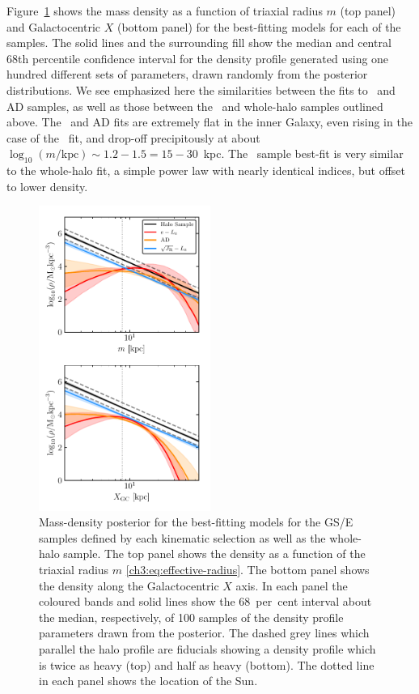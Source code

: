Figure~\ref{ch3:fig:pdensity} shows the mass density as a function of triaxial radius $m$ (top panel) and Galactocentric $X$ (bottom panel) for the best-fitting models for each of the samples. The solid lines and the surrounding fill show the median and central 68th percentile confidence interval for the density profile generated using one hundred different sets of parameters, drawn randomly from the posterior distributions. We see emphasized here the similarities between the fits to \eLz\ and AD samples, as well as those between the \JRLz\ and whole-halo samples outlined above. The \eLz\ and AD fits are extremely flat in the inner Galaxy, even rising in the case of the \eLz\ fit, and drop-off precipitously at about $\log_{10}(m/\mathrm{kpc}) \sim 1.2-1.5 = 15-30$~kpc. The \JRLz\ sample best-fit is very similar to the whole-halo fit, a simple power law with nearly identical indices, but offset to lower density.

\begin{figure}
    \centering
    \includegraphics[width=0.5\textwidth]{figure/ch3/pdensity_gcx.pdf}
    \caption{Mass-density posterior for the best-fitting models for the GS/E samples defined by each kinematic selection as well as the whole-halo sample. The top panel shows the density as a function of the triaxial radius $m$ \eqref{ch3:eq:effective-radius}. The bottom panel shows the density along the Galactocentric $X$ axis. In each panel the coloured bands and solid lines show the 68~per~cent interval about the median, respectively, of 100 samples of the density profile parameters drawn from the posterior. The dashed grey lines which parallel the halo profile are fiducials showing a density profile which is twice as heavy (top) and half as heavy (bottom). The dotted line in each panel shows the location of the Sun.}
    \label{ch3:fig:pdensity}
\end{figure}

